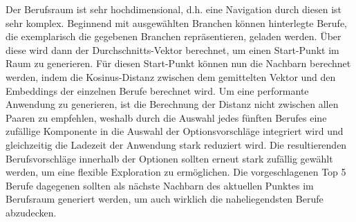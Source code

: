 \documentclass[10pt]{article}
\begin{document}
Der Berufsraum ist sehr hochdimensional, d.h. eine Navigation durch diesen ist
sehr komplex. Beginnend mit ausgewählten Branchen können hinterlegte Berufe, die
exemplarisch die gegebenen Branchen repräsentieren, geladen werden. Über diese
wird dann der Durchschnitts-Vektor berechnet, um einen Start-Punkt im Raum zu
generieren. Für diesen Start-Punkt können nun die Nachbarn berechnet werden,
indem die Kosinus-Distanz zwischen dem gemittelten Vektor und den Embeddings der
einzelnen Berufe berechnet wird. Um eine performante Anwendung zu generieren,
ist die Berechnung der Distanz nicht zwischen allen Paaren zu empfehlen, weshalb
durch die Auswahl jedes fünften Berufes eine zufällige Komponente in die
Auswahl der Optionsvorschläge integriert wird und gleichzeitig die Ladezeit der
Anwendung stark reduziert wird. Die resultierenden Berufsvorschläge innerhalb
der Optionen sollten erneut stark zufällig gewählt werden, um eine flexible
Exploration zu ermöglichen. Die vorgeschlagenen Top 5 Berufe dagegenen sollten
als nächste Nachbarn des aktuellen Punktes im Berufsraum generiert werden, um
auch wirklich die naheliegendsten Berufe abzudecken.
\end{document}
